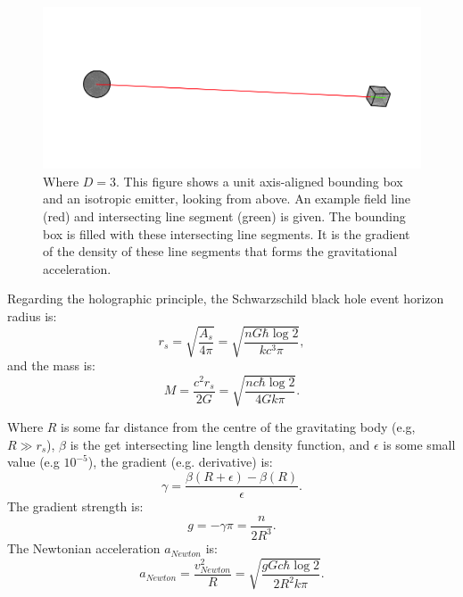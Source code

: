 \documentclass[12pt]{article}
\begin{document}
\begin{figure} 
\centering
\label{fig1}
  \includegraphics[width = 6 in]{AABB.png}
  \caption{
Where $D = 3$.
This figure shows a unit axis-aligned bounding box and an isotropic emitter, looking from above.
An example field line (red) and intersecting line segment (green) is given.
The bounding box is filled with these intersecting line segments.
It is the gradient of the density of these line segments that forms the gravitational acceleration.
}
\end{figure}





Regarding the holographic principle, the Schwarzschild black hole event horizon radius is:
\begin{equation}
r_s = \sqrt{\frac{A_s}{4 \pi}} = \sqrt{\frac{n G \hbar \log 2}{k c^3 \pi}},
\end{equation}
and the mass is:
\begin{equation}
M = \frac{c^2 r_s}{2 G} = \sqrt{\frac{n c \hbar \log 2}{4 G k \pi}}. 
\end{equation}

Where $R$ is some far distance from the centre of the gravitating body (e.g, $R \gg r_s$), $\beta$ is the get intersecting line length density function, and $\epsilon$ is some small value (e.g $10^{-5}$), the gradient (e.g. derivative) is:
\begin{equation}
\gamma = \frac{\beta(R + \epsilon) - \beta(R)}{\epsilon}.
\end{equation}
The gradient strength is:
\begin{equation}
g = -\gamma \pi = \frac{n}{2 R^3}.
\end{equation}
The Newtonian acceleration $a_{\textit{Newton}}$ is:
\begin{equation}
a_{\textit{Newton}} = \frac{v_{\textit{Newton}}^2}{R} = \sqrt{\frac{g G c \hbar \log 2}{2 R^2 k \pi}}.
\end{equation}
\end{document}
